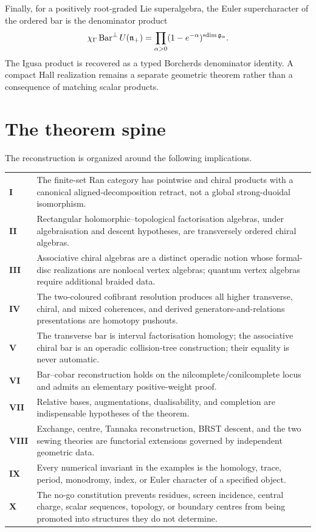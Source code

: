 Finally, for a positively root-graded Lie superalgebra, the Euler supercharacter of the ordered bar is the denominator product
\[
 \chi_\Gamma\operatorname{Bar}^{\perp}U(\mathfrak n_+)
 =\prod_{\alpha>0}(1-e^{-\alpha})^{\operatorname{sdim}\mathfrak g_\alpha}.
\]
The Igusa product is recovered as a typed Borcherds denominator identity.  A compact Hall realization remains a separate geometric theorem rather than a consequence of matching scalar products.

\chapter*{The theorem spine}
The reconstruction is organized around the following implications.
\begin{longtable}{p{}p{}}
\toprule
\textbf{I} & The finite-set Ran category has pointwise and chiral products with a canonical aligned-decomposition retract, not a global strong-duoidal isomorphism.\\
\textbf{II} & Rectangular holomorphic--topological factorisation algebras, under algebraisation and descent hypotheses, are transversely ordered chiral algebras.\\
\textbf{III} & Associative chiral algebras are a distinct operadic notion whose formal-disc realizations are nonlocal vertex algebras; quantum vertex algebras require additional braided data.\\
\textbf{IV} & The two-coloured cofibrant resolution produces all higher transverse, chiral, and mixed coherences, and derived generators-and-relations presentations are homotopy pushouts.\\
\textbf{V} & The transverse bar is interval factorisation homology; the associative chiral bar is an operadic collision-tree construction; their equality is never automatic.\\
\textbf{VI} & Bar--cobar reconstruction holds on the nilcomplete/conilcomplete locus and admits an elementary positive-weight proof.\\
\textbf{VII} & Relative bases, augmentations, dualisability, and completion are indispensable hypotheses of the theorem.\\
\textbf{VIII} & Exchange, centre, Tannaka reconstruction, BRST descent, and the two sewing theories are functorial extensions governed by independent geometric data.\\
\textbf{IX} & Every numerical invariant in the examples is the homology, trace, period, monodromy, index, or Euler character of a specified object.\\
\textbf{X} & The no-go constitution prevents residues, screen incidence, central charge, scalar sequences, topology, or boundary centres from being promoted into structures they do not determine.\\
\bottomrule
\end{longtable}

